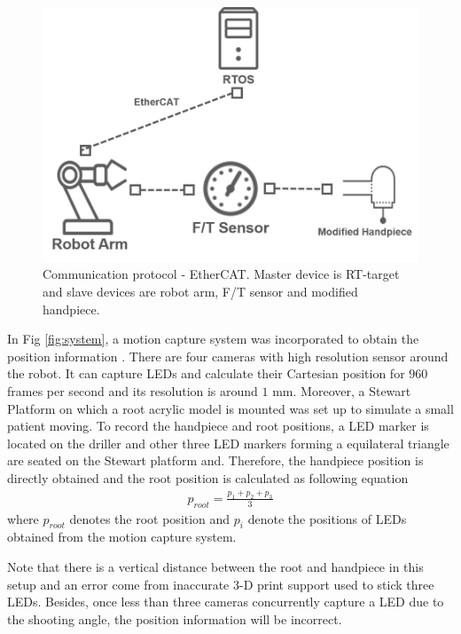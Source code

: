 \begin{figure}[htbp]
\begin{center}
\includegraphics[width=0.7\linewidth]{Images/EtherCAT.png}
\caption{Communication protocol - EtherCAT. Master device is RT-target and slave devices are robot arm, F/T sensor and modified handpiece.}
\label{fig:EtherCAT}

\end{center}
\end{figure}
\par
In Fig \ref{fig:system}, a motion capture system was incorporated to obtain the position information \cite{web8}. There are four cameras with high resolution sensor around the robot. It can capture LEDs and calculate their Cartesian position for $960$ frames per second and its resolution is around $1$ mm. Moreover, a Stewart Platform on which a root acrylic model is mounted was set up to simulate a small patient moving. To record the handpiece and root positions, a LED marker is located on the driller and other three LED markers forming a equilateral triangle are seated on the Stewart platform and. Therefore, the handpiece position is directly obtained and the root position is calculated as following equation
\begin{equation*}
\begin{split}
p_{root} = \frac{p_{1} + p_{2} + p_{3}}{3}
\end{split}
\end{equation*}
where $p_{root}$ denotes the root position and $p_{i}$ denote the positions of LEDs obtained from the motion capture system. 
\par
Note that there is a vertical distance between the root and handpiece in this setup and an error come from inaccurate 3-D print support used to stick three LEDs. Besides, once less than three cameras concurrently capture a LED due to the shooting angle, the position information will be incorrect.  
